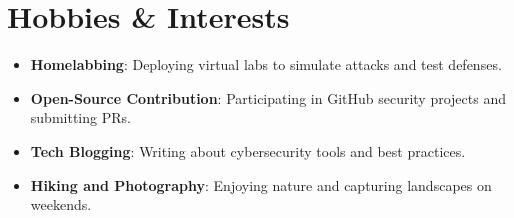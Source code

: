 \documentclass[a4paper,10pt]{article}
\begin{document}
\section{Hobbies \& Interests}
\begin{itemize}
    \item \textbf{Homelabbing}: Deploying virtual labs to simulate attacks and test defenses.
    \item \textbf{Open-Source Contribution}: Participating in GitHub security projects and submitting PRs.
    \item \textbf{Tech Blogging}: Writing about cybersecurity tools and best practices.
    \item \textbf{Hiking and Photography}: Enjoying nature and capturing landscapes on weekends.
\end{itemize}
\end{document}
